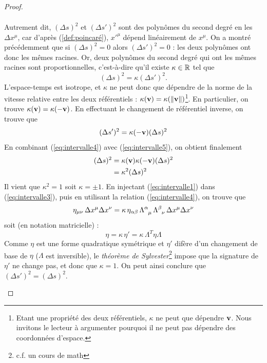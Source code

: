 {\begin{proof}
\begin{enumerate}
\begin{align}
        \end{align}
        Autrement dit, $(\Delta s)^2$ et $(\Delta s')^2$ sont des polynômes du second degré en les $\Delta x^{\mu}$, car d'après (\ref{def:poincaré}), $x'^\mu$ dépend linéairement de $x^\mu$. On a montré précédemment que si $(\Delta s)^2 = 0$ alors $(\Delta s')^2 = 0$ : les deux polynômes ont donc les mêmes racines. Or, deux polynômes du second degré qui ont les mêmes racines sont proportionnelles, c'est-à-dire qu'il existe $\kappa\in \mathbb{R}$ tel que
        \begin{equation} 
            \label{eq:intervalle4}
            (\Delta s)^2 = \kappa (\Delta s')^2.
        \end{equation}
        L'espace-temps est isotrope, et $\kappa$ ne peut donc que dépendre de la norme de la vitesse relative entre les deux référentiels : $\kappa(\bm{\mathrm{v}})=\kappa(\lVert \bm{\mathrm{v}} \rVert)$\footnote{Etant une propriété des deux référentiels, $\kappa$ ne peut que dépendre $\bm{\mathrm{v}}$. Nous invitons le lecteur à argumenter pourquoi il ne peut pas dépendre des coordonnées d'espace.}. En particulier, on trouve $\kappa(\bm{\mathrm{v}}) = \kappa(-\bm{\mathrm{v}})$. En effectuant le changement de référentiel inverse, on trouve que
        \begin{equation}
            (\Delta s')^2 = \kappa(-\bm{\mathrm{v}}) (\Delta s)^2
            \label{eq:intervalle5}
        \end{equation}
        En combinant (\ref{eq:intervalle4}) avec (\ref{eq:intervalle5}), on obtient finalement
        \begin{align}
            (\Delta s)^2 &= \kappa(\bm{\mathrm{v}}) \kappa(-\bm{\mathrm{v}}) (\Delta s)^2\\
            &= \kappa^2(\Delta s)^2
        \end{align}
        Il vient que $\kappa ^2= 1$ soit $\kappa = \pm 1$. En injectant (\ref{eq:intervalle1}) dans (\ref{eq:intervalle3}), puis en utilisant la relation (\ref{eq:intervalle4}), on trouve que
        \begin{equation}
            \eta_{\mu\nu} \, \Delta x^\mu \Delta x^\nu = \kappa \, \eta_{\alpha\beta} \, \Lambda\indices{^\alpha_{\mu}} \, \Lambda\indices{^\beta_{\nu}}\, \Delta x^\mu \Delta x^\nu
        \end{equation}
        soit (en notation matricielle) :
        \begin{equation}
            \label{eq:Lorentz pre}
            \eta = \kappa \,\eta'=\kappa \,\Lambda^T\eta \Lambda
        \end{equation}
        Comme $\eta$ est une forme quadratique symétrique et $\eta'$ difère d'un changement de base de $\eta$ ($\Lambda$ est inversible), le \textit{théorème de Sylvester}\footnote{c.f. un cours de math} impose que la signature de $\eta'$ ne change pas, et donc que $\kappa=1$. On peut ainsi conclure que $(\Delta s')^2 = (\Delta s)^2$.
    \end{enumerate}
\end{proof}

}
